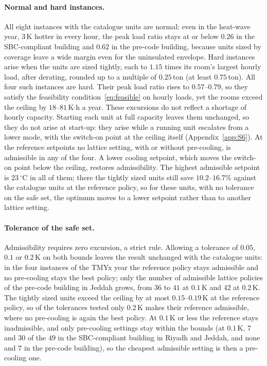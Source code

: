 \documentclass[10pt,a4paper,twocolumn]{article}
\theoremstyle{definition}
\begin{document}
\paragraph{Normal and hard instances.}\label{sec:resinstances} All eight instances with the catalogue units are normal: even in the heat-wave year, $3\,$K hotter in every hour, the peak load ratio stays at or below $0.26$ in the SBC-compliant building and $0.62$ in the pre-code building, because units sized by coverage leave a wide margin even for the uninsulated envelope. Hard instances arise when the units are sized tightly, each to $1.15$ times its room's largest hourly load, after derating, rounded up to a multiple of $0.25\,$ton (at least $0.75\,$ton). All four such instances are hard. Their peak load ratio rises to $0.57$--$0.79$, so they satisfy the feasibility condition~\eqref{eq:feasible} on hourly loads, yet the rooms exceed the ceiling by $18$--$81$\,K$\cdot$h a year. These excursions do not reflect a shortage of hourly capacity. Starting each unit at full capacity leaves them unchanged, so they do not arise at start-up: they arise while a running unit escalates from a lower mode, with the switch-on point at the ceiling itself (Appendix~\ref{app:S6}). At the reference setpoints no lattice setting, with or without pre-cooling, is admissible in any of the four. A lower cooling setpoint, which moves the switch-on point below the ceiling, restores admissibility. The highest admissible setpoint is $23\,^{\circ}$C in all of them; there the tightly sized units still save $10.2$--$16.7$\% against the catalogue units at the reference policy, so for these units, with no tolerance on the safe set, the optimum moves to a lower setpoint rather than to another lattice setting.

\paragraph{Tolerance of the safe set.}\label{sec:tolerance} Admissibility requires zero excursion, a strict rule. Allowing a tolerance of $0.05$, $0.1$ or $0.2\,$K on both bounds leaves the result unchanged with the catalogue units: in the four instances of the TMYx year the reference policy stays admissible and no pre-cooling stays the best policy; only the number of admissible lattice policies of the pre-code building in Jeddah grows, from $36$ to $41$ at $0.1\,$K and $42$ at $0.2\,$K. The tightly sized units exceed the ceiling by at most $0.15$--$0.19$\,K at the reference policy, so of the tolerances tested only $0.2\,$K makes their reference admissible, where no pre-cooling is again the best policy. At $0.1\,$K or less the reference stays inadmissible, and only pre-cooling settings stay within the bounds (at $0.1\,$K, 7 and 30 of the $49$ in the SBC-compliant building in Riyadh and Jeddah, and none and 7 in the pre-code building), so the cheapest admissible setting is then a pre-cooling one.
\end{document}
